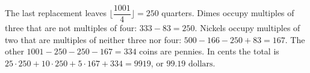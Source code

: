 The last replacement leaves $\lfloor\dfrac{1001}{4}\rfloor=250$ quarters. Dimes occupy multiples of three that are not multiples of four: $333-83=250$. Nickels occupy multiples of two that are multiples of neither three nor four: $500-166-250+83=167$. The other $1001-250-250-167=334$ coins are pennies. In cents the total is $25\cdot250+10\cdot250+5\cdot167+334=9919$, or $\boxed{99.19\text{ dollars}}$.

